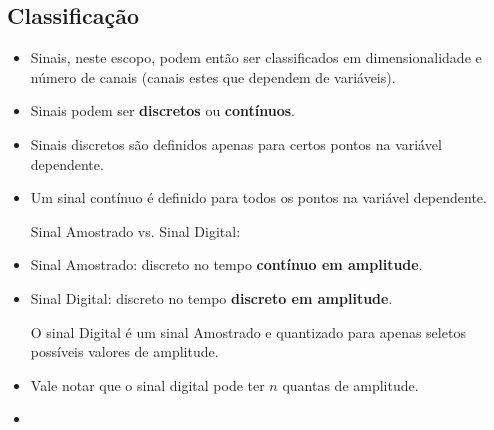 \subsection{Classificação}
\begin{itemize}
    \item Sinais, neste escopo, podem então ser classificados em dimensionalidade e número de canais (canais estes que dependem de variáveis).
    \item Sinais podem ser \textbf{discretos} ou \textbf{contínuos}.
    \item Sinais discretos são definidos apenas para certos pontos na variável dependente.
    \item Um sinal contínuo é definido para todos os pontos na variável dependente.
    
    Sinal Amostrado vs. Sinal Digital:

    \item Sinal Amostrado: discreto no tempo \textbf{contínuo em amplitude}.
    \item Sinal Digital: discreto no tempo \textbf{discreto em amplitude}.
    
    O sinal Digital é um sinal Amostrado e quantizado para apenas seletos possíveis valores de amplitude.

    \item Vale notar que o sinal digital pode ter $n$ quantas de amplitude.
\end{itemize}

\begin{itemize}
    \item 
\end{itemize}
